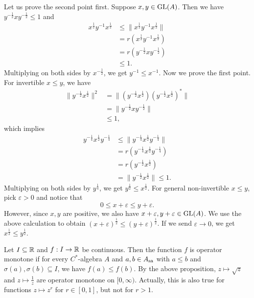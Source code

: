 \begin{myproof}
    Let us prove the second point first. Suppose $x, y \in \operatorname{GL}(A)$.
    Then we have $y^{-\frac{1}{2}} x y^{-\frac{1}{2}} \leq 1$ and 
    \begin{align*}
      x^{\frac{1}{2}} y^{-1} x^{\frac{1}{2}} &\leq \| x^{\frac{1}{2}} y^{-1} x^{\frac{1}{2}}\|\\
      &= r(x^{\frac{1}{2}} y^{-1} x^{\frac{1}{2}})\\
      &= r(y^{-\frac{1}{2}} x y^{-\frac{1}{2}})\\
      &\leq 1.
    \end{align*}
    Multiplying on both sides by $x^{-\frac{1}{2}}$, we get $y^{-1} \leq x^{-1}$.
    Now we prove the first point. For invertible $x \leq y$, we have
    \begin{align*}
      \|y^{-\frac{1}{2}} x^{\frac{1}{2}}\|^2 &= \|(y^{-\frac{1}{2}} x^{\frac{1}{2}}) (y^{-\frac{1}{2}} x^{\frac{1}{2}})^*\|\\
      &= \|y^{-\frac{1}{2}} x y^{-\frac{1}{2}}\|\\
      &\leq 1,
    \end{align*}
    which implies
    \begin{align*}
      y^{-\frac{1}{4}} x^{\frac{1}{2}} y^{-\frac{1}{4}} &\leq \|y^{-\frac{1}{4}} x^{\frac{1}{2}} y^{-\frac{1}{4}}\|\\
      &= r(y^{-\frac{1}{4}} x^{\frac{1}{2}} y^{-\frac{1}{4}})\\
      &= r(y^{-\frac{1}{2}} x^{\frac{1}{2}})\\
      &= \| y^{-\frac{1}{2}} x^{\frac{1}{2}} \| \leq 1.
    \end{align*}
    Multiplying on both sides by $y^{\frac{1}{4}}$, we get $y^{\frac{1}{2}} \leq x^{\frac{1}{2}}$.
    For general non-invertible $x \leq y$, pick $\varepsilon > 0$ and notice that 
    $$0 \leq x + \varepsilon \leq y + \varepsilon.$$ However, since $x, y$ are positive, we also have $x + \varepsilon, y + \varepsilon \in \operatorname{GL}(A)$.
    We use the above calculation to obtain $(x + \varepsilon)^{\frac{1}{2}} \leq (y + \varepsilon)^{\frac{1}{2}}$. If we send $\varepsilon \to 0$,
    we get $x^{\frac{1}{2}} \leq y^{\frac{1}{2}}$.
\end{myproof}

\begin{remark}
  Let $I \subseteq \mathbb {R}$ and $f: I \to \mathbb {R}$ be continuous. Then the function $f$ is operator monotone 
  if for every $C^*$-algebra $A$ and $a, b \in A_{\operatorname{sa}}$ with $ a \leq b$ and $\sigma(a), \sigma(b) \subseteq I$, we have $f(a) \leq f(b)$.
  By the above proposition, $z \mapsto \sqrt{z}$ and $z \mapsto \frac{1}{z}$ are operator monotone on $[0, \infty)$.
  Actually, this is also true for functions $z \mapsto z^r$ for $r \in [0, 1]$, but not for $r > 1$.
\end{remark}

